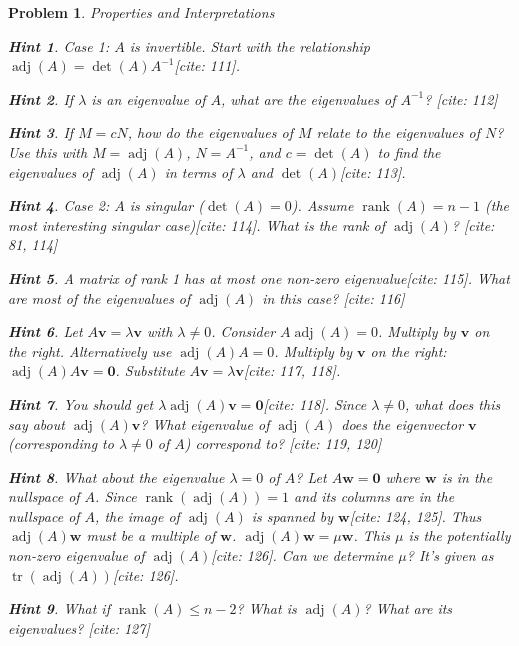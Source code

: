 \documentclass[12pt]{article}
\newtheorem{problem}{Problem}[section]
\theoremstyle{definition}
\newtheorem{hint}{Hint}[question]
\newcommand{\adj}{\operatorname{adj}}
\newcommand{\detm}{\operatorname{det}}
\newcommand{\rank}{\operatorname{rank}}
\newcommand{\tr}{\operatorname{tr}}
\begin{document}
\begin{problem}{Properties and Interpretations}
        \begin{hint}
             Case 1: $A$ is invertible. Start with the relationship $\adj(A) = \detm(A) A^{-1}$[cite: 111].
        \end{hint}
         \begin{hint}
             If $\lambda$ is an eigenvalue of $A$, what are the eigenvalues of $A^{-1}$? [cite: 112]
         \end{hint}
         \begin{hint}
              If $M = c N$, how do the eigenvalues of $M$ relate to the eigenvalues of $N$? Use this with $M = \adj(A)$, $N=A^{-1}$, and $c = \detm(A)$ to find the eigenvalues of $\adj(A)$ in terms of $\lambda$ and $\detm(A)$[cite: 113].
         \end{hint}
         \begin{hint}
              Case 2: $A$ is singular ($\detm(A)=0$). Assume $\rank(A)=n-1$ (the most interesting singular case)[cite: 114]. What is the rank of $\adj(A)$? [cite: 81, 114]
         \end{hint}
         \begin{hint}
              A matrix of rank 1 has at most one non-zero eigenvalue[cite: 115]. What are most of the eigenvalues of $\adj(A)$ in this case? [cite: 116]
         \end{hint}
         \begin{hint}
              Let $A\mathbf{v} = \lambda \mathbf{v}$ with $\lambda \neq 0$. Consider $A \adj(A) = 0$. Multiply by $\mathbf{v}$ on the right. Alternatively use $\adj(A) A = 0$. Multiply by $\mathbf{v}$ on the right: $\adj(A) A \mathbf{v} = \mathbf{0}$. Substitute $A\mathbf{v}=\lambda \mathbf{v}$[cite: 117, 118].
         \end{hint}
          \begin{hint}
              You should get $\lambda \adj(A) \mathbf{v} = \mathbf{0}$[cite: 118]. Since $\lambda \neq 0$, what does this say about $\adj(A)\mathbf{v}$? What eigenvalue of $\adj(A)$ does the eigenvector $\mathbf{v}$ (corresponding to $\lambda \neq 0$ of $A$) correspond to? [cite: 119, 120]
          \end{hint}
          \begin{hint}
              What about the eigenvalue $\lambda=0$ of $A$? Let $A\mathbf{w} = \mathbf{0}$ where $\mathbf{w}$ is in the nullspace of $A$. Since $\rank(\adj(A))=1$ and its columns are in the nullspace of $A$, the image of $\adj(A)$ is spanned by $\mathbf{w}$[cite: 124, 125]. Thus $\adj(A)\mathbf{w}$ must be a multiple of $\mathbf{w}$. $\adj(A)\mathbf{w} = \mu \mathbf{w}$. This $\mu$ is the potentially non-zero eigenvalue of $\adj(A)$[cite: 126]. Can we determine $\mu$? It's given as $\tr(\adj(A))$[cite: 126].
          \end{hint}
         \begin{hint}
             What if $\rank(A) \le n-2$? What is $\adj(A)$? What are its eigenvalues? [cite: 127]
         \end{hint}
     
\end{problem}
\end{document}
